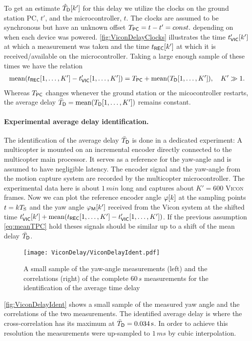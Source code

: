 To get an estimate $\hat{T}_{\mathsf{D}}[k']$ for this delay we utilize the clocks on the ground station PC, $t'$, and the microcontroller, $t$.
The clocks are assumed to be synchronous but have an unknown offset $T_{\mathsf{PC}} = t - t' = const.$ depending on when each device was powered.
\autoref{fig:ViconDelayClocks} illustrates the time $t_{\mathsf{VIC}}'[k']$ at which a measurement was taken and the time $t_{\mathsf{REC}}[k']$ at which it is received/available on the microcontroller.
Taking a large enough sample of these times we have the relation
\begin{align}\label{eq:meanTPC}
 \text{mean} (t_{\mathsf{REC}}[1,\ldots,K'] - t_{\mathsf{VIC}}'[1,\ldots,K']) = T_{\mathsf{PC}} + \text{mean}(T_{\mathsf{D}}[1,\ldots,K']), \quad K'\gg 1.
\end{align}
Whereas $T_{\mathsf{PC}}$ changes whenever the ground station or the micocontroller restarts, the average delay $\bar{T}_{\mathsf{D}} = \text{mean}(T_{\mathsf{D}}[1,\ldots,K'])$ remains constant.

\paragraph{Experimental average delay identification.}
The identification of the average delay $\bar{T}_{\mathsf{D}}$ is done in a dedicated experiment:
A multicopter is mounted on an incremental encoder directly connected to the multicopter main processor.
It serves as a reference for the yaw-angle and is assumed to have negligible latency.
The encoder signal and the yaw-angle from the motion capture system are recorded by the multicopter microcontroller.
The experimental data here is about $1\,\unit{min}$ long and captures about $K' = 600$ \textsc{Vicon} frames.
Now we can plot the reference encoder angle $\varphi[k]$ at the sampling points $t = kT_{\mathrm{S}}$ and the yaw angle $\varphi_{\mathsf{M}}[k']$ received from the Vicon system at the shifted time $t_{\mathsf{VIC}}'[k'] + \text{mean}(t_{\mathsf{REC}}[1,\ldots,K'] - t_{\mathsf{VIC}}'[1,\ldots,K'])$.
If the previous assumption \eqref{eq:meanTPC} hold theses signals should be similar up to a shift of the mean delay $\bar{T}_{\mathsf{D}}$.

\begin{figure}[ht]
 \centering
 \texttt{[image: ViconDelay/ViconDelayIdent.pdf]}
 \caption{A small sample of the yaw-angle measurements (left) and the correlations (right) of the complete $60\,\unit{s}$ measurements for the identification of the average time delay}
 \label{fig:ViconDelayIdent}
\end{figure}

\autoref{fig:ViconDelayIdent} shows a small sample of the measured yaw angle and the correlations of the two measurements.
The identified average delay is where the cross-correlation has its maximum at $\bar{T}_{\mathsf{D}} = 0.034\,\text{s}$.
In order to achieve this resolution the measurements were up-sampled to $1\,\unit{ms}$ by cubic interpolation.


